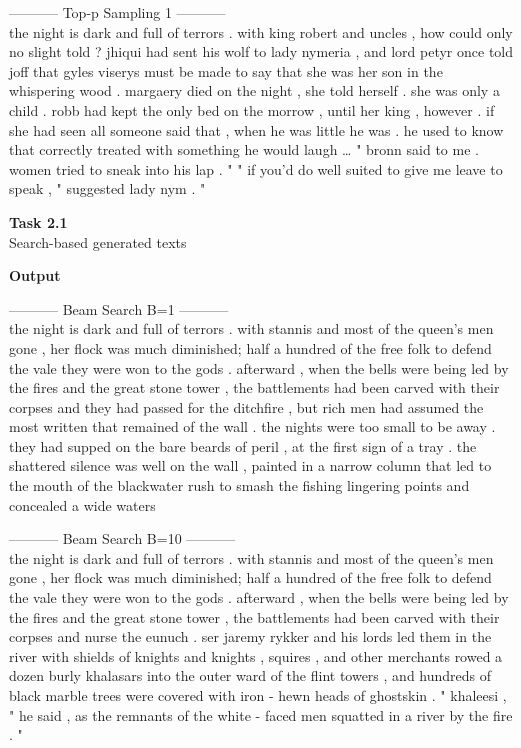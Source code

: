 \documentclass[12pt,article]{article}
\newenvironment{task}[2][Task]
    { \begin{mdframed}[backgroundcolor=gray!20] \textbf{#1 #2} \\}
    {  \end{mdframed}}
\begin{document}
----------- Top-p Sampling 1 -----------\\
the night is dark and full of terrors . with king robert and uncles , how could only no slight told ? jhiqui had sent his wolf to lady nymeria , and lord petyr once told joff that gyles viserys must be made to say that she was her son in the whispering wood . margaery died on the night , she told herself . she was only a child . robb had kept the only bed on the morrow , until her king , however . if she had seen all someone said that , when he was little he was . he used to know that correctly treated with something he would laugh … " bronn said to me . women tried to sneak into his lap . " " if you'd do well suited to give me leave to speak , " suggested lady nym . "

\newpage
\begin{task}{2.1} 
Search-based generated texts
\end{task}
\textbf{Output}

----------- Beam Search B=1 ----------- \\
the night is dark and full of terrors . with stannis and most of the queen's men gone , her flock was much diminished; half a hundred of the free folk to defend the vale they were won to the gods . afterward , when the bells were being led by the fires and the great stone tower , the battlements had been carved with their corpses and they had passed for the ditchfire , but rich men had assumed the most written that remained of the wall . the nights were too small to be away . they had supped on the bare beards of peril , at the first sign of a tray . the shattered silence was well on the wall , painted in a narrow column that led to the mouth of the blackwater rush to smash the fishing lingering points and concealed a wide waters

----------- Beam Search B=10 ----------- \\
the night is dark and full of terrors . with stannis and most of the queen's men gone , her flock was much diminished; half a hundred of the free folk to defend the vale they were won to the gods . afterward , when the bells were being led by the fires and the great stone tower , the battlements had been carved with their corpses and nurse the eunuch . ser jaremy rykker and his lords led them in the river with shields of knights and knights , squires , and other merchants rowed a dozen burly khalasars into the outer ward of the flint towers , and hundreds of black marble trees were covered with iron - hewn heads of ghostskin . " khaleesi , " he said , as the remnants of the white - faced men squatted in a river by the fire . "
\end{document}
